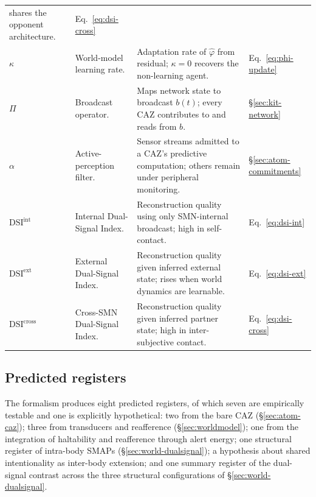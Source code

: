 \documentclass{article}
\begin{document}
\begin{table}[h]
\begin{tabularx}{\linewidth}{@{}l l X l@{}}
shares the opponent architecture. & Eq.~\eqref{eq:dsi-cross} \\
\addlinespace[2pt]
$\kappa$ & World-model learning rate. &
Adaptation rate of $\hat\varphi$ from residual; $\kappa=0$ recovers the
non-learning agent. & Eq.~\eqref{eq:phi-update} \\
\addlinespace[2pt]
$\Pi$ & Broadcast operator. &
Maps network state to broadcast $b(t)$; every CAZ contributes to and reads
from $b$. & \S\ref{sec:kit-network} \\
\addlinespace[2pt]
$\alpha$ & Active-perception filter. &
Sensor streams admitted to a CAZ's predictive computation; others remain
under peripheral monitoring. & \S\ref{sec:atom-commitments} \\
\addlinespace[2pt]
$\mathrm{DSI}^{\mathrm{int}}$ & Internal Dual-Signal Index. &
Reconstruction quality using only SMN-internal broadcast; high in
self-contact. & Eq.~\eqref{eq:dsi-int} \\
\addlinespace[2pt]
$\mathrm{DSI}^{\mathrm{ext}}$ & External Dual-Signal Index. &
Reconstruction quality given inferred external state; rises when world
dynamics are learnable. & Eq.~\eqref{eq:dsi-ext} \\
\addlinespace[2pt]
$\mathrm{DSI}^{\mathrm{cross}}$ & Cross-SMN Dual-Signal Index. &
Reconstruction quality given inferred partner state; high in
inter-subjective contact. & Eq.~\eqref{eq:dsi-cross} \\
\bottomrule
\end{tabularx}
\end{table}

\subsection{Predicted registers}\label{sec:registers}

The formalism produces eight predicted registers, of which seven are
empirically testable and one is explicitly hypothetical: two from the
bare CAZ (\S\ref{sec:atom-caz}); three from transducers and reafference
(\S\ref{sec:worldmodel}); one from the integration of haltability and
reafference through alert energy; one structural register of intra-body
SMAPs (\S\ref{sec:world-dualsignal}); a hypothesis about shared
intentionality as inter-body extension; and one summary register of the
dual-signal contrast across the three structural configurations of
\S\ref{sec:world-dualsignal}.
\end{document}

